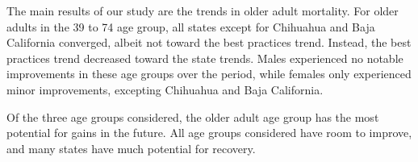 \documentclass{article}
\begin{document}
The main results of our study are the trends in older adult mortality.
For older adults in the 39 to 74 age group, all states except for Chihuahua and
Baja California converged, albeit not toward the best practices trend. Instead,
the best practices trend decreased toward the state trends. Males experienced no
notable improvements in these age groups over the period, while females only
experienced minor improvements, excepting Chihuahua and
Baja California. 

Of the three age groups considered, the older adult age group
has the most potential for gains in the future. All age groups considered have
room to improve, and many states have much potential for recovery.

%
\newpage
 
\end{document}
